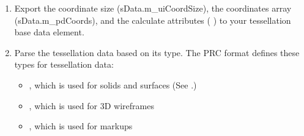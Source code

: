 \documentclass[letterpaper,12pt,english,openany,oneside]{sphinxmanual}
\begin{document}
\begin{sphinxVerbatim}[commandchars=\\\{\}]
 
    
\end{sphinxVerbatim}
\begin{enumerate}
%
\setcounter{enumi}{2}
\item {} 
Export the coordinate size (sData.m\_uiCoordSize), the coordinates array (sData.m\_pdCoords), and the calculate attributes ( ) to your tessellation base data element.

\item {} 
Parse the tessellation data based on its type. The PRC format defines these types for tessellation data:
\begin{itemize}
\item {} 
, which is used for solids and surfaces (See .)

\item {} 
, which is used for 3D wireframes

\item {} 
, which is used for markups

\end{itemize}

\end{enumerate}
\end{document}
